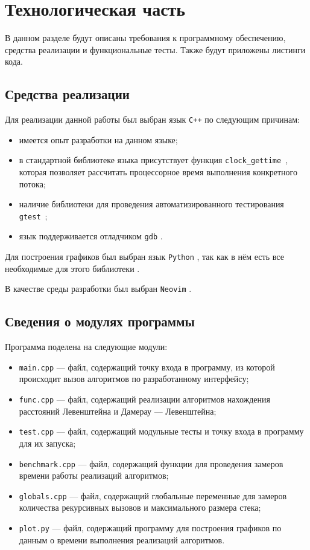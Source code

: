 \section{Технологическая часть}

В данном разделе будут описаны требования к программному обеспечению, средства реализации и функциональные тесты.
Также будут приложены листинги кода.

\subsection{Средства реализации}

Для реализации данной работы был выбран язык \texttt{C++} \cite{isocpp} по следующим причинам:
\begin{itemize}
    \item имеется опыт разработки на данном языке;
    \item в стандартной библиотеке языка присутствует функция \texttt{clock\_gettime}~\cite{cpptime}, которая позволяет рассчитать процессорное время выполнения конкретного потока;
    \item наличие библиотеки для проведения автоматизированного тестирования \texttt{gtest}~\cite{gtest};
    \item язык поддерживается отладчиком \texttt{gdb} \cite{gdb}.
\end{itemize}

Для построения графиков был выбран язык \texttt{Python} \cite{python}, так как в нём есть все необходимые для этого библиотеки \cite{pd} \cite{np} \cite{mpl}.

В качестве среды разработки был выбран \texttt{Neovim} \cite{nvim}. %

\subsection{Сведения о модулях программы}

Программа поделена на следующие модули:
\begin{itemize}
    \item \texttt{main.cpp} --- файл, содержащий точку входа в программу, из которой происходит вызов алгоритмов по разработанному интерфейсу;
    \item \texttt{func.cpp} --- файл, содержащий реализации алгоритмов нахождения расстояний Левенштейна и Дамерау --- Левенштейна;
    \item \texttt{test.cpp} --- файл, содержащий модульные тесты и точку входа в программу для их запуска;
    \item \texttt{benchmark.cpp} --- файл, содержащий функции для проведения замеров времени работы реализаций алгоритмов;
    \item \texttt{globals.cpp} --- файл, содержащий глобальные переменные для замеров количества рекурсивных вызовов и максимального размера стека;
    \item \texttt{plot.py} --- файл, содержащий программу для построения графиков по данным о времени выполнения реализаций алгоритмов.
\end{itemize}

